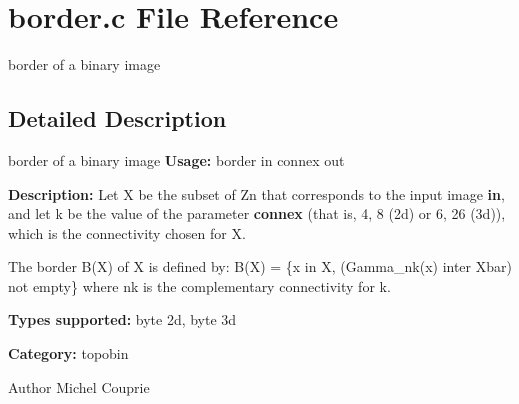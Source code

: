 \section{border.c File Reference}
\label{border_8c}


border of a binary image  




\subsection{Detailed Description}
border of a binary image {\bfseries Usage:} border in connex out

{\bfseries Description:} Let X be the subset of Zn that corresponds to the input image {\bfseries in}, and let k be the value of the parameter {\bfseries connex} (that is, 4, 8 (2d) or 6, 26 (3d)), which is the connectivity chosen for X.

The border B(X) of X is defined by: B(X) = \{x in X, (Gamma\_\-nk(x) inter Xbar) not empty\} where nk is the complementary connectivity for k.

{\bfseries Types supported:} byte 2d, byte 3d

{\bfseries Category:} topobin

\begin{DoxyAuthor}{Author}
Michel Couprie 
\end{DoxyAuthor}
